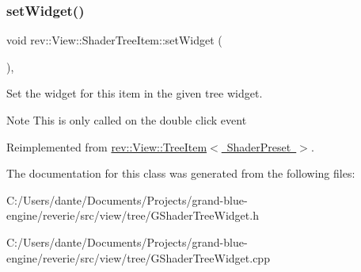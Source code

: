 \subsubsection{\texorpdfstring{setWidget()}{setWidget()}}
{\footnotesize\ttfamily void rev\+::\+View\+::\+Shader\+Tree\+Item\+::set\+Widget (\begin{DoxyParamCaption}{ }\end{DoxyParamCaption})\hspace{0.3cm}{\ttfamily [override]}, {\ttfamily [virtual]}}



Set the widget for this item in the given tree widget. 

\begin{DoxyNote}{Note}
This is only called on the double click event 
\end{DoxyNote}


Reimplemented from \mbox{\hyperlink{classrev_1_1_view_1_1_tree_item_a24faa4e374ec0728c7eda8f50ca575df}{rev\+::\+View\+::\+Tree\+Item$<$ Shader\+Preset $>$}}.



The documentation for this class was generated from the following files\+:\begin{DoxyCompactItemize}
\item 
C\+:/\+Users/dante/\+Documents/\+Projects/grand-\/blue-\/engine/reverie/src/view/tree/G\+Shader\+Tree\+Widget.\+h\item 
C\+:/\+Users/dante/\+Documents/\+Projects/grand-\/blue-\/engine/reverie/src/view/tree/G\+Shader\+Tree\+Widget.\+cpp\end{DoxyCompactItemize}
